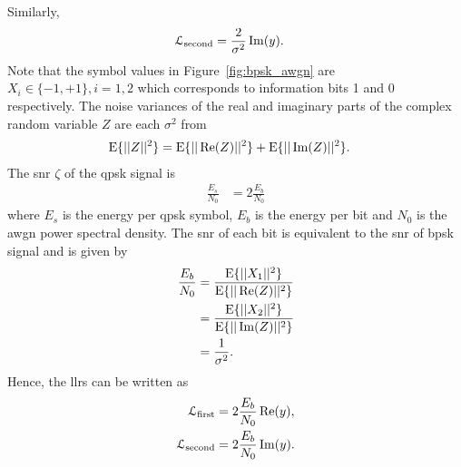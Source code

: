Similarly,
\begin{align}
\mathcal{L}_{\text{second}}&=\frac{2}{\sigma^2}\operatorname{Im}(y)\label{eq:final_llr2}.
\end{align}
Note that the symbol values in Figure~\ref{fig:bpsk_awgn} are $X_i\in\{-1,+1\},i=1,2$ which corresponds to information bits 1 and 0 respectively. The noise variances of the real and imaginary parts of the complex random variable $Z$ are each $\sigma^2$ from
\begin{align}
\text{E}\{||Z||^2\}&=\text{E}\{||\operatorname{Re}(Z)||^2\}+\text{E}\{||\operatorname{Im}(Z)||^2\}.
\end{align}
The \ac{snr} $\zeta$ of the \ac{qpsk} signal is
\begin{align}
\frac{E_s}{N_0}&=2\frac{E_b}{N_0}
\end{align}
where $E_s$ is the energy per \ac{qpsk} symbol, $E_b$ is the energy per bit and $N_0$ is the \ac{awgn} power spectral density. The \ac{snr} of each bit is equivalent to the \ac{snr} of \ac{bpsk} signal and is given by
\begin{align}
\frac{E_b}{N_0}&=\frac{\text{E}\{||X_1||^2\}}{\text{E}\{||\operatorname{Re}(Z)||^2\}}\\
&=\frac{\text{E}\{||X_2||^2\}}{\text{E}\{||\operatorname{Im}(Z)||^2\}}\\
&=\frac{1}{\sigma^2}.
\end{align}
Hence, the \acp{llr} can be written as
\begin{align}
\mathcal{L}_{\text{first}}&=2\frac{E_b}{N_0}\operatorname{Re}(y),\\
\mathcal{L}_{\text{second}}&=2\frac{E_b}{N_0}\operatorname{Im}(y).
\end{align}

